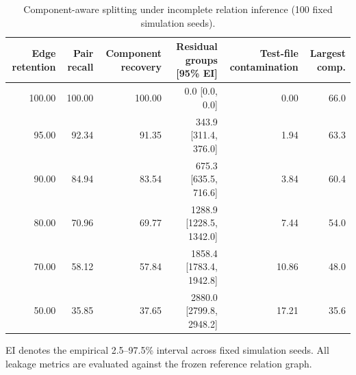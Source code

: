 \begin{table}[t]
\caption{Component-aware splitting under incomplete relation inference (100 fixed simulation seeds).}
\label{tab:fn-robustness}
\centering
\scriptsize
\begin{tabular}{rrrrrr}
\toprule
Edge retention & Pair recall & Component recovery & Residual groups [95\% EI] & Test-file contamination & Largest comp. \\
\midrule
100.00 & 100.00 & 100.00 & 0.0 [0.0, 0.0] & 0.00 & 66.0 \\
95.00 & 92.34 & 91.35 & 343.9 [311.4, 376.0] & 1.94 & 63.3 \\
90.00 & 84.94 & 83.54 & 675.3 [635.5, 716.6] & 3.84 & 60.4 \\
80.00 & 70.96 & 69.77 & 1288.9 [1228.5, 1342.0] & 7.44 & 54.0 \\
70.00 & 58.12 & 57.84 & 1858.4 [1783.4, 1942.8] & 10.86 & 48.0 \\
50.00 & 35.85 & 37.65 & 2880.0 [2799.8, 2948.2] & 17.21 & 35.6 \\
\bottomrule
\end{tabular}
\vspace{2pt}
\begin{minipage}{\textwidth}
\footnotesize EI denotes the empirical 2.5--97.5\% interval across fixed simulation seeds. All leakage metrics are evaluated against the frozen reference relation graph.
\end{minipage}
\end{table}
